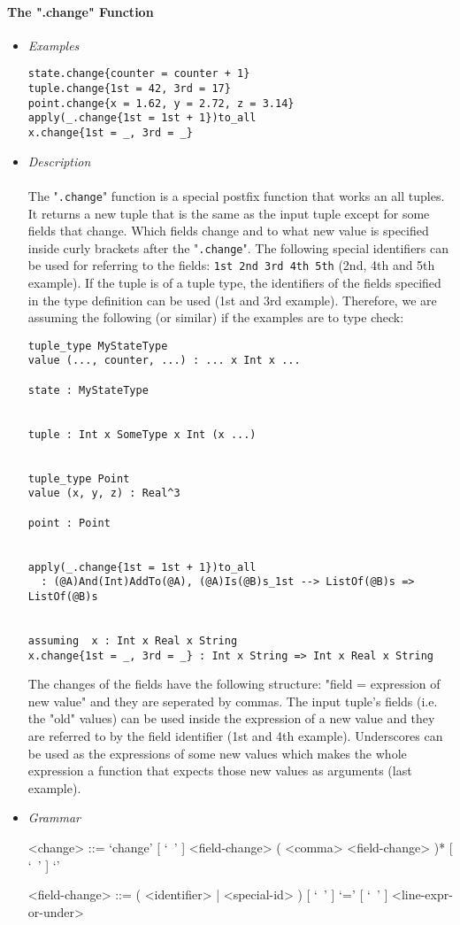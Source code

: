 \documentclass{article}
\begin{document}
\paragraph{The ".change" Function}

\begin{itemize}

\item \textit{Examples}

\begin{verbatim}
state.change{counter = counter + 1} 
tuple.change{1st = 42, 3rd = 17}
point.change{x = 1.62, y = 2.72, z = 3.14}
apply(_.change{1st = 1st + 1})to_all
x.change{1st = _, 3rd = _}
\end{verbatim}

\item \textit{Description}
\\\\
The "\texttt{.change}" function is a special postfix function that works an all
tuples. It returns a new tuple that is the same as the input tuple except for
some fields that change. Which fields change and to what new value is specified
inside curly brackets after the "\texttt{.change}". The following special
identifiers can be used for referring to the fields: \texttt{1st 2nd 3rd 4th
5th} (2nd, 4th and 5th example). If the tuple is of a tuple type, the
identifiers of the fields specified in the type definition can be used (1st and
3rd example).  Therefore, we are assuming the following (or similar) if the
examples are to type check:

\begin{verbatim}
tuple_type MyStateType
value (..., counter, ...) : ... x Int x ...

state : MyStateType


tuple : Int x SomeType x Int (x ...)


tuple_type Point
value (x, y, z) : Real^3

point : Point


apply(_.change{1st = 1st + 1})to_all
  : (@A)And(Int)AddTo(@A), (@A)Is(@B)s_1st --> ListOf(@B)s => ListOf(@B)s


assuming  x : Int x Real x String
x.change{1st = _, 3rd = _} : Int x String => Int x Real x String
\end{verbatim}
The changes of the fields have the following structure: "field = expression of
new value" and they are seperated by commas. The input tuple's fields (i.e. the
"old" values) can be used inside the expression of a new value and they are
referred to by the field identifier (1st and 4th example). Underscores can be 
used as the expressions of some new values which makes the whole expression 
a function that expects those new values as arguments (last example).
\item \textit{Grammar}

\begin{grammar}
<change> ::=
`change{' [ `\ ' ] <field-change> ( <comma> <field-change> )* [ `\ ' ] `}'

<field-change> ::=
( <identifier> | <special-id> ) [ `\ ' ] `=' [ `\ ' ] <line-expr-or-under>
\end{grammar} 

\end{itemize}
\end{document}
